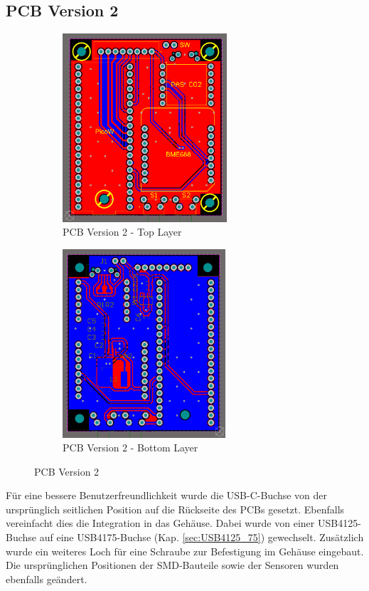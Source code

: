 \begin{inhalt}
  
\section{PCB Version 2}


   \begin{figure}[H] 
  \centering
  \begin{subfigure}[b]{0.48\textwidth}
    \centering
    \includegraphics[height=7cm]{files/Tobias/pics/Schaltungen/PCB/Version2_Top.PNG}
    \caption{PCB Version 2 - Top Layer}
    \label{fig:PCB_Version2_Top}
  \end{subfigure}
  \hfill
  \begin{subfigure}[b]{0.48\textwidth}
    \centering
    \includegraphics[height=7cm]{files/Tobias/pics/Schaltungen/PCB/Version2_Bottom.PNG}
    \caption{PCB Version 2 - Bottom Layer}
    \label{fig:PCB_Version2_Bot}
  \end{subfigure}
  \caption{PCB Version 2}
  \label{fig:PCB_Version_2}
\end{figure}

Für eine bessere Benutzerfreundlichkeit wurde die USB-C-Buchse von der ursprünglich seitlichen Position auf die Rückseite des PCBs gesetzt. Ebenfalls vereinfacht dies die Integration in das Gehäuse. Dabei wurde von einer USB4125-Buchse auf eine USB4175-Buchse (Kap. \ref{sec:USB4125_75}) gewechselt. Zusätzlich wurde ein weiteres Loch für eine Schraube zur Befestigung im Gehäuse eingebaut. Die ursprünglichen Positionen der SMD-Bauteile sowie der Sensoren wurden ebenfalls geändert.


\end{inhalt}

